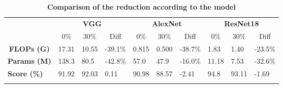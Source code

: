 \documentclass[12pt]{article}
\begin{document}
\begin{table}[H]
	\caption {\textbf{Comparison of the reduction according to the model}}
	\begin{tabular}{cccccccccc}
		\multicolumn{1}{l}{\textbf{}}           & \multicolumn{3}{c}{\textbf{VGG}}                                                                            & \multicolumn{3}{c}{\textbf{AlexNet}}                                                                        & \multicolumn{3}{c}{\textbf{ResNet18}}                                                                      \\
		\multicolumn{1}{l}{}                    & 0\%                       & 30\%                      & Diff                                                & 0\%                       & 30\%                      & Diff                                                & 0\%                       & 30\%                      & Diff                                               \\ \cline{2-10} 
		\multicolumn{1}{c|}{\textbf{FLOPs (G)}}  & \multicolumn{1}{l}{17.31} & \multicolumn{1}{l}{10.55} & \multicolumn{1}{l|}{{\color[HTML]{009901} -39.1\%}} & \multicolumn{1}{l}{0.815} & \multicolumn{1}{l}{0.500} & \multicolumn{1}{l|}{{\color[HTML]{009901} -38.7\%}} & \multicolumn{1}{l}{1.83}  & \multicolumn{1}{l}{1.40}  & \multicolumn{1}{l}{{\color[HTML]{009901} -23.5\%}} \\
		\multicolumn{1}{c|}{\textbf{Params (M)}} & \multicolumn{1}{l}{138.3} & \multicolumn{1}{l}{80.5}  & \multicolumn{1}{l|}{{\color[HTML]{009901} -42.8\%}} & \multicolumn{1}{l}{57.0}  & \multicolumn{1}{l}{47.9}  & \multicolumn{1}{l|}{{\color[HTML]{009901} -16.0\%}} & \multicolumn{1}{l}{11.18} & \multicolumn{1}{l}{7.53}  & \multicolumn{1}{l}{{\color[HTML]{009901} -32.6\%}} \\
		\multicolumn{1}{l|}{\textbf{Score (\%)}} & \multicolumn{1}{l}{91.92} & \multicolumn{1}{l}{92.03} & \multicolumn{1}{l|}{{\color[HTML]{009901} 0.11}}    & \multicolumn{1}{l}{90.98} & \multicolumn{1}{l}{88.57} & \multicolumn{1}{l|}{{\color[HTML]{9A0000} -2.41}}   & \multicolumn{1}{l}{94.8}  & \multicolumn{1}{l}{93.11} & \multicolumn{1}{l}{{\color[HTML]{9A0000} -1.69}}   \\ \hline
		\multicolumn{1}{l}{}                    & \multicolumn{1}{l}{}      & \multicolumn{1}{l}{}      & \multicolumn{1}{l}{}                                & \multicolumn{1}{l}{}      & \multicolumn{1}{l}{}      & \multicolumn{1}{l}{}                                & \multicolumn{1}{l}{}      & \multicolumn{1}{l}{}      & \multicolumn{1}{l}{}                               \\

\end{tabular}
\end{table}
\end{document}
